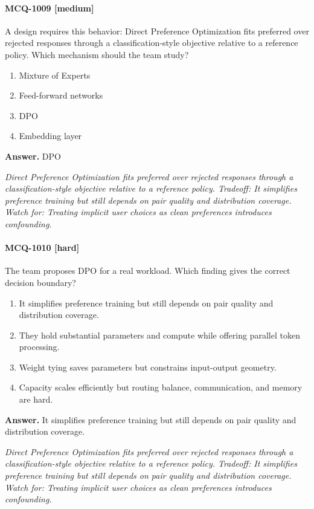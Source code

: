 \paragraph{MCQ-1009 [medium]} A design requires this behavior: Direct Preference Optimization fits preferred over rejected responses through a classification-style objective relative to a reference policy. Which mechanism should the team study?
\begin{enumerate}[label=\Alph*.]
\item Mixture of Experts
\item Feed-forward networks
\item DPO
\item Embedding layer
\end{enumerate}
\noindent\textbf{Answer.} DPO
\par\textit{Direct Preference Optimization fits preferred over rejected responses through a classification-style objective relative to a reference policy. Tradeoff: It simplifies preference training but still depends on pair quality and distribution coverage. Watch for: Treating implicit user choices as clean preferences introduces confounding.}
\paragraph{MCQ-1010 [hard]} The team proposes DPO for a real workload. Which finding gives the correct decision boundary?
\begin{enumerate}[label=\Alph*.]
\item It simplifies preference training but still depends on pair quality and distribution coverage.
\item They hold substantial parameters and compute while offering parallel token processing.
\item Weight tying saves parameters but constrains input-output geometry.
\item Capacity scales efficiently but routing balance, communication, and memory are hard.
\end{enumerate}
\noindent\textbf{Answer.} It simplifies preference training but still depends on pair quality and distribution coverage.
\par\textit{Direct Preference Optimization fits preferred over rejected responses through a classification-style objective relative to a reference policy. Tradeoff: It simplifies preference training but still depends on pair quality and distribution coverage. Watch for: Treating implicit user choices as clean preferences introduces confounding.}
